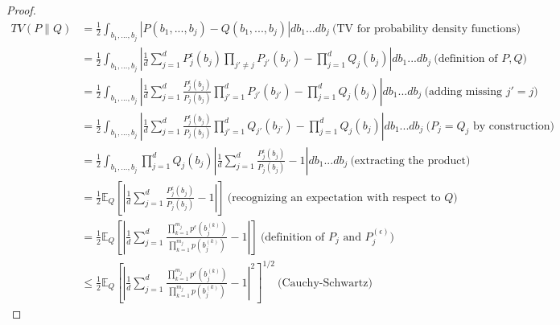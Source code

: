 \begin{proof}
\begin{align*}
    TV (P\parallel Q)
        &= \frac{1}{2} \int_{b_1, ..., b_j}
            \left|
            P(b_1, ..., b_j) 
            - Q(b_1, ..., b_j)
            \right|
            db_1...db_j 
            ~\text{(TV for probability density functions)}\\
        &= \frac{1}{2} \int_{b_1, ..., b_j}
            \left|
            \frac{1}{d}\sum_{j=1}^d P_j^{\epsilon}(b_j)\prod_{j'\neq j}P_{j'}(b_{j'})
            - 
            \prod_{j=1}^d Q_j(b_j)
            \right|
            db_1...db_j 
            ~\text{(definition of $P, Q$)}\\
        &= \frac{1}{2} \int_{b_1, ..., b_j}
            \left|
            \frac{1}{d}\sum_{j=1}^d \frac{P_j^{\epsilon}(b_j)}{P_j(b_j)}\prod_{j'=1}^dP_{j'}(b_{j'})
            -
            \prod_{j=1}^d Q_j(b_j)
            \right|
            db_1...db_j 
            ~\text{(adding missing $j'=j$)}\\
        &= \frac{1}{2} \int_{b_1, ..., b_j}
            \left|
            \frac{1}{d}\sum_{j=1}^d \frac{P_j^{\epsilon}(b_j)}{P_j(b_j)}\prod_{j'=1}^d Q_{j'}(b_{j'})
            -
            \prod_{j=1}^d Q_j(b_j)
            \right|
            db_1...db_j 
            ~\text{($P_j = Q_j$ by construction)}\\
        &= \frac{1}{2} \int_{b_1, ..., b_j}
            \prod_{j=1}^d Q_j(b_j)
            \left|
            \frac{1}{d}\sum_{j=1}^d \frac{P_j^{\epsilon}(b_j)}{P_j(b_j)}
            -
            1
            \right|
            db_1...db_j 
            ~\text{(extracting the product)}\\
        &= \frac{1}{2} 
            \mathbb{E}_Q 
            \left[
            \left|
            \frac{1}{d}\sum_{j=1}^d \frac{P_j^{\epsilon}(b_j)}{P_j(b_j)}
            -
            1\right|
            \right]
            ~\text{(recognizing an expectation with respect to $Q$)}\\
        &= \frac{1}{2} 
            \mathbb{E}_Q 
            \left[
            \left|
            \frac{1}{d}\sum_{j=1}^d \frac{\prod_{k=1}^{m_j} p^{\epsilon}(b_j^{(k)})}{\prod_{k=1}^{m_j} p(b_j^{(k)})}
            -
            1
            \right|
            \right]
            ~\text{(definition of $P_j$ and $P_j^{(\epsilon)}$)}\\
        &\leq \frac{1}{2} 
            \mathbb{E}_Q 
            \left[
            \left|
            \frac{1}{d}
            \sum_{j=1}^d \frac{\prod_{k=1}^{m_j} p^{\epsilon}(b_j^{(k)})}{\prod_{k=1}^{m_j} p(b_j^{(k)})}
            -
            1
            \right|^2
            \right]^{1/2}
            ~\text{(Cauchy-Schwartz)}
\end{align*}



\end{proof}
